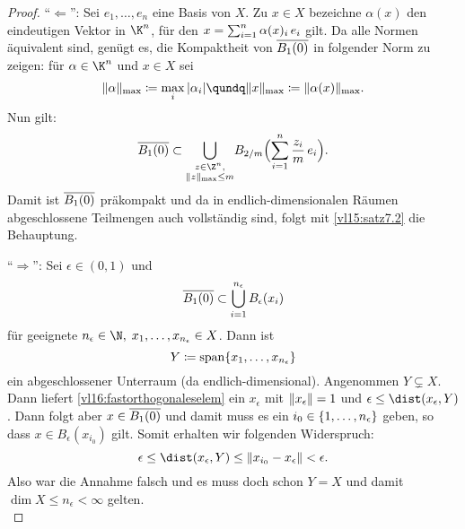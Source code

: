 \begin{proof}
    \enquote{$\Leftarrow$}: Sei $e_1,\dots,e_n$ eine Basis von $X$. 
    Zu $x\in X$ bezeichne $\alpha(x)$ den eindeutigen Vektor in $\K^n$,
    für den $x = \sum_{i=1}^n \alpha(x)_i\,e_i$ gilt.
    Da alle Normen äquivalent sind, genügt es, die Kompaktheit von 
    $\overline{B_1(0)}$ in folgender Norm zu zeigen: für $\alpha\in\K^n$ 
    und $x\in X$ sei
    \[ \norm{\alpha}_\mr{max} \defeq \max_i \, \abs{\alpha_i} \qundq
    \norm{x}_\mr{max} \defeq \norm{\alpha(x)}_\mr{max}  . \]
    Nun gilt:
    \[
        \setclosure{B_1(0)} \subset
        \bigcup_{\substack{z\in\Z^n,\\\norm{z}_\mr{max}\leq m}}
        \mkern-3mu B_{2/m}\Bigl( \isum^n \frac{z_i}{m}\, e_i \Bigr)
    . \]
    Damit ist $\overline{B_1(0)}$ präkompakt und da in endlich-dimensionalen
    Räumen abgeschlossene Teilmengen auch vollständig sind, folgt mit
    \cref{vl15:satz7.2} die Behauptung.
    
    \enquote{$\Rightarrow$}: Sei $\epsilon\in(0,1)$ und
    \[ \overline{B_1(0)} \subset \bigcup_{i=1}^{n_\epsilon} B_\epsilon(x_i)
    \]
    für geeignete $n_\epsilon\in\N,\;x_1,\ldots,x_{n_\epsilon}\in X$. Dann ist
    \[ Y \coloneqq \operatorname{span}\{x_1,\dots,x_{n_\epsilon}\} \]
    ein abgeschlossener Unterraum (da endlich-dimensional). Angenommen
    $Y\subsetneq X$. Dann liefert \cref{vl16:fastorthogonaleselem}
    ein $x_\epsilon$ mit $\lVert x_\epsilon\rVert=1$ und $\epsilon \leq
    \dist(x_\epsilon, Y)$. Dann folgt aber $x\in \overline{B_1(0)}$
    und damit muss es ein $i_0\in\{1,\ldots,n_\epsilon\}$ geben, so dass
    $x\in B_\epsilon(x_{i_0})$ gilt. Somit erhalten wir folgenden Widerspruch:
    \[ \epsilon \leq \dist(x_\epsilon, Y) 
        \leq \norm{x_{i_0}-x_\epsilon}
        < \epsilon
    . \]
    Also war die Annahme falsch und es muss doch schon $Y=X$ und damit 
    $\dim X \leq n_\epsilon < \infty$ gelten.
    \\
\end{proof}

